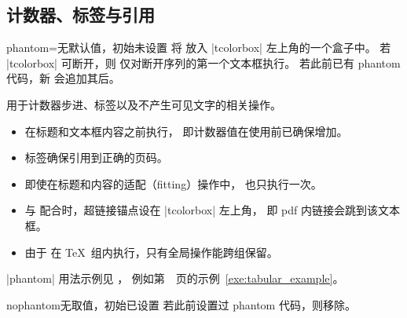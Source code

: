 
\clearpage
\subsection{计数器、标签与引用}

\begin{docTcbKey}{phantom}{=}{无默认值，初始未设置}
将  放入 |tcolorbox| 左上角的一个盒子中。
若 |tcolorbox| 可断开，则  仅对断开序列的第一个文本框执行。
若此前已有 phantom 代码，新  会追加其后。\par
{} 用于计数器步进、标签以及不产生可见文字的相关操作。
\begin{itemize}
\item {} 在标题和文本框内容之前执行，
  即计数器值在使用前已确保增加。
\item 标签确保引用到正确的页码。
\item 即使在标题和内容的适配（fitting）操作中， 也只执行一次。
\item 与  配合时，超链接锚点设在 |tcolorbox| 左上角，
  即 pdf 内链接会跳到该文本框。
\item 由于  在 \TeX\ 组内执行，只有全局操作能跨组保留。
\end{itemize}
|phantom| 用法示例见 ，
例如第~\pageref{exe:tabular_example}~页的示例~\ref{exe:tabular_example}。
\end{docTcbKey}

\begin{docTcbKey}{nophantom}{}{无取值，初始已设置}
若此前设置过 phantom 代码，则移除。
\end{docTcbKey}




